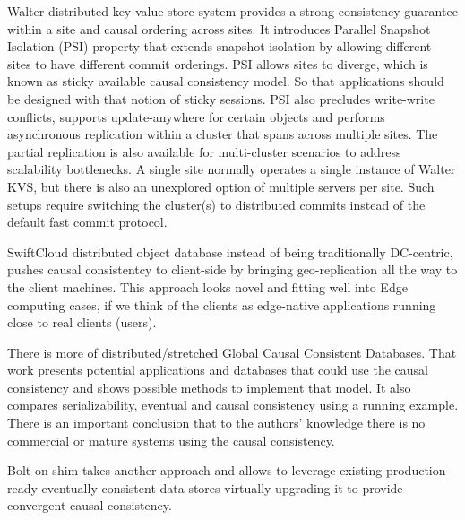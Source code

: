 \documentclass[conference]{IEEEtran}
\begin{document}
Walter distributed key-value store system\cite{b11} provides a strong
consistency guarantee within a site and causal ordering across sites. It
introduces Parallel Snapshot Isolation (PSI) property that extends snapshot
isolation by allowing different sites to have different commit orderings. PSI
allows sites to diverge, which is known as sticky available causal consistency
model. So that applications should be designed with that notion of sticky
sessions. PSI also precludes write-write conflicts, supports update-anywhere
for certain objects and performs asynchronous replication within a cluster that
spans across multiple sites. The partial replication is also available for
multi-cluster scenarios to address scalability bottlenecks. A single site
normally operates a single instance of Walter KVS, but there is also an
unexplored option of multiple servers per site. Such setups require switching
the cluster(s) to distributed commits instead of the default fast commit
protocol.

SwiftCloud distributed object database\cite{b12} instead of being traditionally
DC-centric, pushes causal consistentcy to client-side by bringing
geo-replication all the way to the client machines. This approach looks novel
and fitting well into Edge computing cases, if we think of the clients as
edge-native applications running close to real clients (users).

There is more of distributed/stretched Global Causal Consistent
Databases\cite{b6}. That work presents potential applications and databases
that could use the causal consistency and shows possible methods to implement
that model. It also compares serializability, eventual and causal consistency
using a running example. There is an important conclusion that to the authors’
knowledge there is no commercial or mature systems using the causal
consistency.

Bolt-on\cite{b13} shim takes another approach and allows to leverage existing
production-ready eventually consistent data stores virtually upgrading it to
provide convergent causal consistency.
\end{document}
